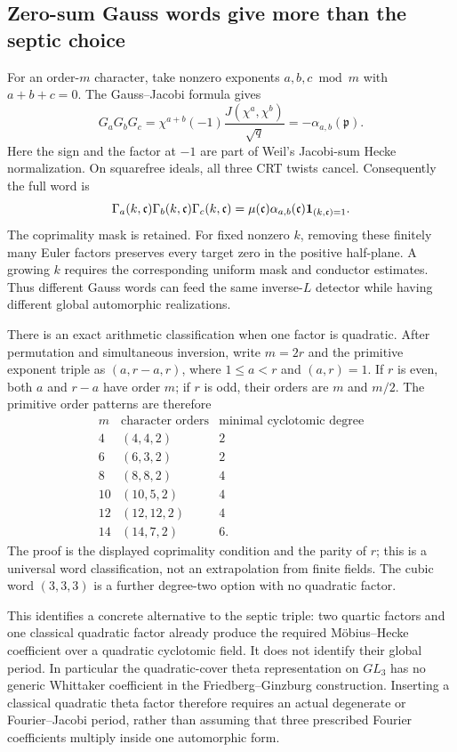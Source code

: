 \documentclass[11pt]{article}
\begin{document}
\subsection{Zero-sum Gauss words give more than the septic choice}

For an order-\(m\) character, take nonzero exponents \(a,b,c\bmod m\)
with \(a+b+c=0\). The Gauss--Jacobi formula gives
\[
 G_aG_bG_c=
 \chi^{a+b}(-1)\frac{J(\chi^a,\chi^b)}{\sqrt q}
 =-\alpha_{a,b}(\mathfrak p).
\]
Here the sign and the factor at \(-1\) are part of Weil's
Jacobi-sum Hecke normalization. On squarefree ideals, all three CRT
twists cancel. Consequently the full word is
\[
 \Gamma_a(k,\mathfrak c)\Gamma_b(k,\mathfrak c)
 \Gamma_c(k,\mathfrak c)
 =\mu(\mathfrak c)\alpha_{a,b}(\mathfrak c)
       {\bf1}_{(k,\mathfrak c)=1}.
\]
The coprimality mask is retained. For fixed nonzero \(k\), removing
these finitely many Euler factors preserves every target zero in the
positive half-plane. A growing \(k\) requires the corresponding
uniform mask and conductor estimates. Thus different Gauss words can
feed the same inverse-\(L\) detector while having different global
automorphic realizations.

There is an exact arithmetic classification when one factor is
quadratic. After permutation and simultaneous inversion, write
\(m=2r\) and the primitive exponent triple as
\((a,r-a,r)\), where \(1\le a<r\) and \((a,r)=1\).
If \(r\) is even, both \(a\) and \(r-a\) have order \(m\);
if \(r\) is odd, their orders are \(m\) and \(m/2\).
The primitive order patterns are therefore
\[
\begin{array}{c|c|c}
 m&\text{character orders}&\text{minimal cyclotomic degree}\\ \hline
 4&(4,4,2)&2\\
 6&(6,3,2)&2\\
 8&(8,8,2)&4\\
 10&(10,5,2)&4\\
 12&(12,12,2)&4\\
 14&(14,7,2)&6 .
\end{array}
\]
The proof is the displayed coprimality condition and the parity of
\(r\); this is a universal word classification, not an extrapolation
from finite fields. The cubic word \((3,3,3)\) is a further
degree-two option with no quadratic factor.

This identifies a concrete alternative to the septic triple:
two quartic factors and one classical quadratic factor already
produce the required Möbius--Hecke coefficient over a quadratic
cyclotomic field. It does not identify their global period.
In particular the quadratic-cover theta representation on \(GL_3\)
has no generic Whittaker coefficient in the Friedberg--Ginzburg
construction. Inserting a classical quadratic theta factor therefore
requires an actual degenerate or Fourier--Jacobi period, rather than
assuming that three prescribed Fourier coefficients multiply inside
one automorphic form.
\end{document}
